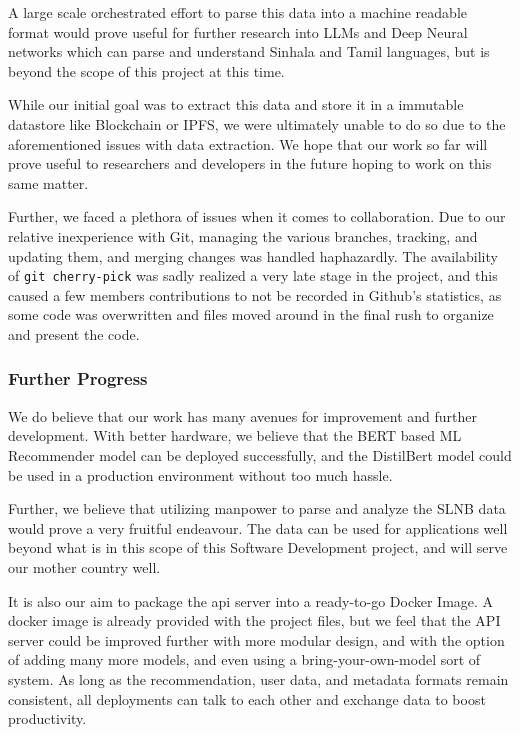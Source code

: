 A large scale orchestrated effort to parse this data into a machine readable format would prove useful for further research into LLMs and Deep Neural networks which can parse and understand Sinhala and Tamil languages, but is beyond the scope of this project at this time.

While our initial goal was to extract this data and store it in a immutable datastore like Blockchain or IPFS, we were ultimately unable to do so due to the aforementioned issues with data extraction. We hope that our work so far will prove useful to researchers and developers in the future hoping to work on this same matter.

Further, we faced a plethora of issues when it comes to collaboration. Due to our relative inexperience with Git, managing the various branches, tracking, and updating them, and merging changes was handled haphazardly. The availability of \texttt{git cherry-pick} was sadly realized a very late stage in the project, and this caused a few members contributions to not be recorded in Github's statistics, as some code was overwritten and files moved around in the final rush to organize and present the code.

\subsubsection*{Further Progress}
We do believe that our work has many avenues for improvement and further development. With better hardware, we believe that the BERT based ML Recommender model can be deployed successfully, and the DistilBert model could be used in a production environment without too much hassle.

Further, we believe that utilizing manpower to parse and analyze the SLNB data would prove a very fruitful endeavour. The data can be used for applications well beyond what is in this scope of this Software Development project, and will serve our mother country well.

It is also our aim to package the api server into a ready-to-go Docker Image. A docker image is already provided with the project files, but we feel that the API server could be improved further with more modular design, and with the option of adding many more models, and even using a bring-your-own-model sort of system. As long as the recommendation, user data, and metadata formats remain consistent, all deployments can talk to each other and exchange data to boost productivity.